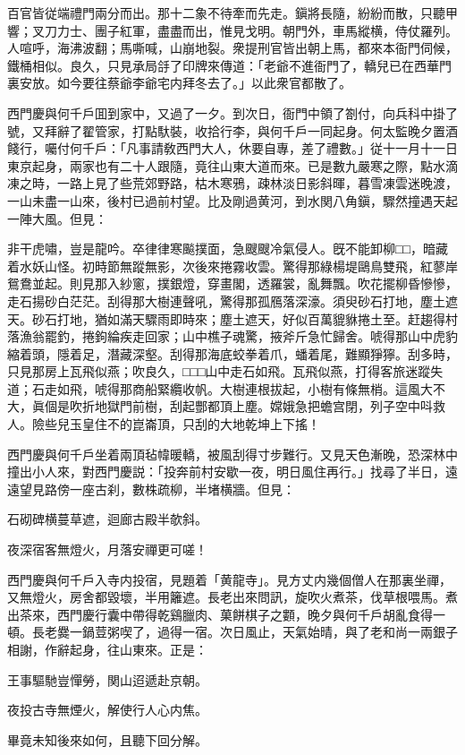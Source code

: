 百官皆従端禮門兩分而出。那十二象不待牽而先走。鎭將長隨，紛紛而散，只聽甲響；叉刀力士、團子紅軍，盡盡而出，惟見戈明。朝門外，車馬縱横，侍仗羅列。人喧呼，海沸波翻；馬嘶喊，山崩地裂。衆提刑官皆出朝上馬，都來本衙門伺候，鐵桶相似。良久，只見承局㧱了印牌來傳道：「老爺不進衙門了，轎兒已在西華門裏安放。如今要往蔡爺李爺宅内拜冬去了。」以此衆官都散了。

西門慶與何千戶囬到家中，又過了一夕。到次日，衙門中領了劄付，向兵科中掛了號，又拜辭了翟管家，打點馱裝，收拾行李，與何千戶一同起身。何太監晚夕置酒餞行，囑付何千戶：「凡事請敎西門大人，休要自專，差了禮數。」従十一月十一日東京起身，兩家也有二十人跟隨，竟往山東大道而來。已是數九嚴寒之際，點水滴凍之時，一路上見了些荒郊野路，枯木寒鴉，疎林淡日影斜暉，暮雪凍雲迷晚渡，一山未盡一山來，後村已過前村望。比及剛過黄河，到水関八角鎭，驟然撞遇天起一陣大風。但見：

\begin{myquote}
非干虎嘯，豈是龍吟。卒律律寒飈撲面，急颼颼冷氣侵人。旣不能卸柳□□，暗藏着水妖山怪。初時節無蹤無影，次後來捲霧收雲。驚得那綠楊堤鷗鳥雙飛，紅蓼岸鴛鴦並起。則見那入紗窻，撲銀燈，穿畫閣，透羅裳，亂舞飄。吹花擺柳昏慘慘，走石揚砂白茫茫。刮得那大樹連聲吼，驚得那孤鴈落深濠。須臾砂石打地，塵土遮天。砂石打地，猶如滿天驟雨即時來；塵土遮天，好似百萬貔貅捲土至。赶趨得村落漁翁罷釣，捲鉤綸疾走回家；山中樵子魂驚，掖斧斤急忙歸舍。唬得那山中虎豹縮着頭，隱着足，潛藏深壑。刮得那海底蛟拳着爪，蟠着尾，難顯猙獰。刮多時，只見那房上瓦飛似燕；吹良久，□□□山中走石如飛。瓦飛似燕，打得客旅迷蹤失道；石走如飛，唬得那商船緊纜收帆。大樹連根拔起，小樹有條無梢。這風大不大，眞個是吹折地獄門前樹，刮起酆都頂上塵。嫦娥急把蟾宫閉，列子空中呌救人。險些兒玉皇住不的崑崙頂，只刮的大地乾坤上下搖！
\end{myquote}

西門慶與何千戶坐着兩頂毡幃暖轎，被風刮得寸步難行。又見天色漸晚，恐深林中撞出小人來，對西門慶説：「投奔前村安歇一夜，明日風住再行。」找尋了半日，遠遠望見路傍一座古刹，數株疏柳，半堵横牆。但見：

\begin{myquote}
石砌碑横蔓草遮，迴廊古殿半欹斜。

夜深宿客無燈火，月落安禪更可嗟！
\end{myquote}

西門慶與何千戶入寺内投宿，見題着「黄龍寺」。見方丈内幾個僧人在那裏坐禪，又無燈火，房舍都毀壞，半用籬遮。長老出來問訊，旋吹火煮茶，伐草根喂馬。煮出茶來，西門慶行囊中帶得乾鷄臘肉、菓餅棋子之䫫，晚夕與何千戶胡亂食得一頓。長老爨一鍋荳粥喫了，過得一宿。次日風止，天氣始晴，與了老和尚一兩銀子相謝，作辭起身，往山東來。正是：

\begin{myquote}
王事驅馳豈憚勞，関山迢遞赴京朝。

夜投古寺無煙火，解使行人心内焦。
\end{myquote}

畢竟未知後來如何，且聽下回分解。

